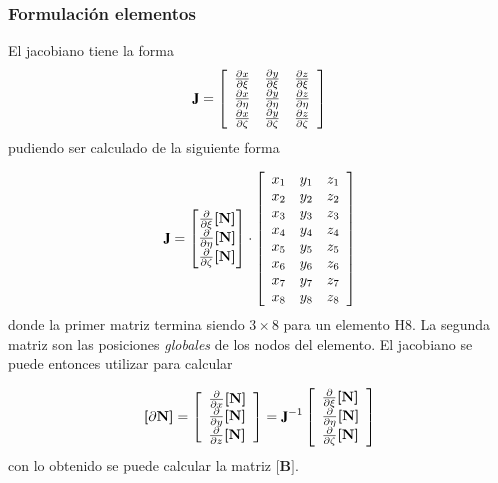\documentclass[11pt, a4paper,titlepage]{article}
\newcommand{\rmfontbf}[1]{{\fontfamily{ptm}\selectfont%
\textbf{#1}}}
\newcommand{\jac}{\rmfontbf{J}}
\newcommand{\Mme}[1]{\boldsymbol{[}\mathbf{#1} \boldsymbol{]}}
\newcommand{\MB}{\Mme{B}}
\newcommand{\MN}{\Mme{N}}
\newcommand{\spartial}[2]{\ensuremath{\frac{\partial #1}{\partial #2}}}
\begin{document}
\subsubsection*{Formulación elementos}
El jacobiano tiene la forma
\[
\jac=
\left[\begin{array}{lll}\spartial{x}{\xi} & \spartial{y}{\xi}  & \spartial{z}{\xi}  \\ \spartial{x}{\eta}  &\spartial{y}{\eta}  &\spartial{z}{\eta} \\\spartial{x}{\zeta} & \spartial{y}{\zeta} &\spartial{z}{\zeta}\end{array}\right]
\]
pudiendo ser calculado de la siguiente forma

\begin{equation}
	\jac = \begin{bmatrix}
	\frac{\partial}{\partial \xi} \MN \\
	\frac{\partial}{\partial \eta} \MN \\
	\frac{\partial}{\partial \zeta} \MN 
	\end{bmatrix}
	\cdot 
\left[\begin{array}{lll}{x_{1}} & {y_{1}} & {z_{1}} \\ {x_{2}} & {y_{2}} & {z_{2}} \\ {x_{3}} & {y_{3}} & {z_{3}} \\ {x_{4}} & {y_{4}} & {z_{4}} \\ {x_{5}} & {y_{5}} & {z_{5}} \\ {x_{6}} & {y_{6}} & {z_{6}} \\ {x_{7}} & {y_{7}} & {z_{7}} \\ {x_{8}} & {y_{8}} & {z_{8}}\end{array}\right]
\end{equation}
donde la primer matriz termina siendo $3\times8$ para un elemento H8. La segunda matriz son las posiciones \textit{globales} de los nodos del elemento. El jacobiano se puede entonces utilizar para calcular

\begin{equation}
	\Mme{\partial N}=\left[\begin{array}{l} \frac{\partial}{\partial x}\MN  \\ \frac{\partial}{\partial y} \MN  \\ \frac{\partial}{\partial z} \MN  \end{array}\right]=\jac^{-1}\left[\begin{array}{l}\frac{\partial}{\partial \xi} \MN \\
	\frac{\partial}{\partial \eta} \MN \\ 
	\frac{\partial}{\partial \zeta} \MN \end{array}\right]
\end{equation}
con lo obtenido se puede calcular la matriz $\MB$.
\end{document}
